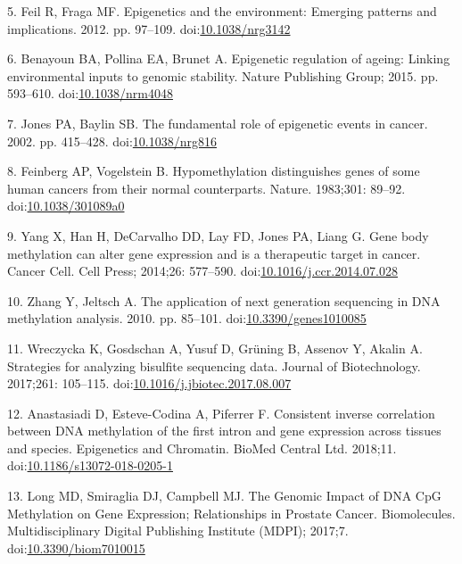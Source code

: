 \documentclass[10pt,letterpaper]{article}
\begin{document}
\leavevmode\hypertarget{ref-Feil2012}{}%
5. Feil R, Fraga MF. Epigenetics and the environment: Emerging patterns
and implications. 2012. pp. 97--109.
doi:\href{https://doi.org/10.1038/nrg3142}{10.1038/nrg3142}

\leavevmode\hypertarget{ref-Benayoun2015}{}%
6. Benayoun BA, Pollina EA, Brunet A. Epigenetic regulation of ageing:
Linking environmental inputs to genomic stability. Nature Publishing
Group; 2015. pp. 593--610.
doi:\href{https://doi.org/10.1038/nrm4048}{10.1038/nrm4048}

\leavevmode\hypertarget{ref-Jones2002}{}%
7. Jones PA, Baylin SB. The fundamental role of epigenetic events in
cancer. 2002. pp. 415--428.
doi:\href{https://doi.org/10.1038/nrg816}{10.1038/nrg816}

\leavevmode\hypertarget{ref-Feinberg1983}{}%
8. Feinberg AP, Vogelstein B. Hypomethylation distinguishes genes of
some human cancers from their normal counterparts. Nature. 1983;301:
89--92. doi:\href{https://doi.org/10.1038/301089a0}{10.1038/301089a0}

\leavevmode\hypertarget{ref-Yang2014}{}%
9. Yang X, Han H, DeCarvalho DD, Lay FD, Jones PA, Liang G. Gene body
methylation can alter gene expression and is a therapeutic target in
cancer. Cancer Cell. Cell Press; 2014;26: 577--590.
doi:\href{https://doi.org/10.1016/j.ccr.2014.07.028}{10.1016/j.ccr.2014.07.028}

\leavevmode\hypertarget{ref-Zhang2010}{}%
10. Zhang Y, Jeltsch A. The application of next generation sequencing in
DNA methylation analysis. 2010. pp. 85--101.
doi:\href{https://doi.org/10.3390/genes1010085}{10.3390/genes1010085}

\leavevmode\hypertarget{ref-Wreczycka2017}{}%
11. Wreczycka K, Gosdschan A, Yusuf D, Grüning B, Assenov Y, Akalin A.
Strategies for analyzing bisulfite sequencing data. Journal of
Biotechnology. 2017;261: 105--115.
doi:\href{https://doi.org/10.1016/j.jbiotec.2017.08.007}{10.1016/j.jbiotec.2017.08.007}

\leavevmode\hypertarget{ref-Anastasiadi2018}{}%
12. Anastasiadi D, Esteve-Codina A, Piferrer F. Consistent inverse
correlation between DNA methylation of the first intron and gene
expression across tissues and species. Epigenetics and Chromatin. BioMed
Central Ltd. 2018;11.
doi:\href{https://doi.org/10.1186/s13072-018-0205-1}{10.1186/s13072-018-0205-1}

\leavevmode\hypertarget{ref-Long2017}{}%
13. Long MD, Smiraglia DJ, Campbell MJ. The Genomic Impact of DNA CpG
Methylation on Gene Expression; Relationships in Prostate Cancer.
Biomolecules. Multidisciplinary Digital Publishing Institute (MDPI);
2017;7.
doi:\href{https://doi.org/10.3390/biom7010015}{10.3390/biom7010015}
\end{document}

